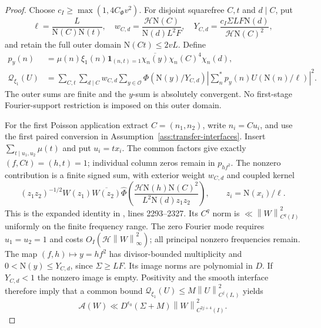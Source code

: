 \documentclass[11pt]{article}
\numberwithin{equation}{section}
\theoremstyle{definition}
\theoremstyle{remark}
\newcommand{\OO}{\mathcal O}
\newcommand{\N}{\mathrm N}
\newcommand{\norm}[1]{\left\|#1\right\|}
\begin{document}
\begin{proof}
Choose $c_I\ge\max(1,4C_\Phi v^2)$. For disjoint squarefree $C,t$ and
$d\mid C$, put
\[
 \ell=\frac L{\N(C)\N(t)},\quad
 w_{C,d}=\frac{\mathcal H\N(C)}{\N(d)L^2F},\quad
 Y_{C,d}=\frac{c_I\Sigma LF\N(d)}{\mathcal H\N(C)^2},
\]
and retain the full outer domain $\N(Ct)\le2vL$. Define
\[
\begin{aligned}
 p_y(n)&=\mu(n)\xi_1(n)\mathbf1_{(n,t)=1}
       \overline{\chi_n(y)}\chi_n(C)^4\chi_n(d),\\
 \mathcal Q_{\xi_1}(U)&=\sum_{C,t}\sum_{d\mid C}w_{C,d}
       \sum_{y\in\OO}\Phi(\N(y)/Y_{C,d})
       \left|\sum_n^*p_y(n)U(\N(n)/\ell)\right|^2.
\end{aligned}
\]
The outer sums are finite and the $y$-sum is absolutely convergent.
No first-stage Fourier-support restriction is imposed on this outer domain.

For the first Poisson application extract $C=(n_1,n_2)$, write $n_i=Cu_i$,
and use the first paired conversion in Assumption~\ref{ass:transfer-interfaces}.
Insert $\sum_{t\mid u_1,u_2}\mu(t)$ and put $u_i=tx_i$.
The common factors give exactly $(f,Ct)=(h,t)=1$; individual column zeros
remain in $p_{hf^2}$. The nonzero contribution is a finite signed sum,
with exterior weight $w_{C,d}$ and coupled kernel
\[
 (z_1z_2)^{-1/2}W(z_1)\overline{W(z_2)}
 \widehat\Phi\!\left(\frac{\mathcal H\N(h)\N(C)^2}
 {L^2\N(d)z_1z_2}\right),\qquad z_i=\N(x_i)/\ell.
\]
This is the expanded identity in \cite{Source}, lines 2293--2327.
Its $C^q$ norm is $\ll\norm{W}_{C^q(I)}^2$ uniformly on the finite
frequency range. The zero Fourier mode requires $u_1=u_2=1$ and costs
$O_I(\mathcal H\norm{W}_\infty^2)$; all principal nonzero frequencies remain.
The map $(f,h)\mapsto y=hf^2$ has divisor-bounded multiplicity and
$0<\N(y)\le Y_{C,d}$, since $\Sigma\ge LF$. Its image norms are polynomial
in $D$. If $Y_{C,d}<1$ the nonzero image is empty. Positivity and the smooth
interface therefore imply that a common bound
$\mathcal Q_{\xi_1}(U)\le M\norm{U}_{C^j(I_*)}^2$ yields
\begin{equation}\label{eq:transfer-first-bound}
 \mathcal A(W)\ll D^{\epsilon_0}(\Sigma+M)
                  \norm{W}_{C^{2j+4}(I)}^2.
\end{equation}


\end{proof}
\end{document}

